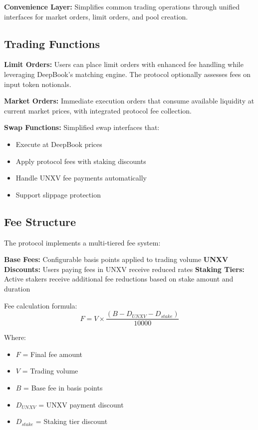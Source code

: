 \documentclass[12pt]{article}
\begin{document}
\textbf{Convenience Layer:} Simplifies common trading operations through unified interfaces for market orders, limit orders, and pool creation.

\subsection{Trading Functions}

\textbf{Limit Orders:} Users can place limit orders with enhanced fee handling while leveraging DeepBook's matching engine. The protocol optionally assesses fees on input token notionals.

\textbf{Market Orders:} Immediate execution orders that consume available liquidity at current market prices, with integrated protocol fee collection.

\textbf{Swap Functions:} Simplified swap interfaces that:
\begin{itemize}
    \item Execute at DeepBook prices
    \item Apply protocol fees with staking discounts
    \item Handle UNXV fee payments automatically
    \item Support slippage protection
\end{itemize}

\subsection{Fee Structure}

The protocol implements a multi-tiered fee system:

\textbf{Base Fees:} Configurable basis points applied to trading volume
\textbf{UNXV Discounts:} Users paying fees in UNXV receive reduced rates
\textbf{Staking Tiers:} Active stakers receive additional fee reductions based on stake amount and duration

Fee calculation formula:
$$F = V \times \frac{(B - D_{UNXV} - D_{stake})}{10000}$$

Where:
\begin{itemize}
    \item $F$ = Final fee amount
    \item $V$ = Trading volume
    \item $B$ = Base fee in basis points
    \item $D_{UNXV}$ = UNXV payment discount
    \item $D_{stake}$ = Staking tier discount
\end{itemize}
\end{document}
